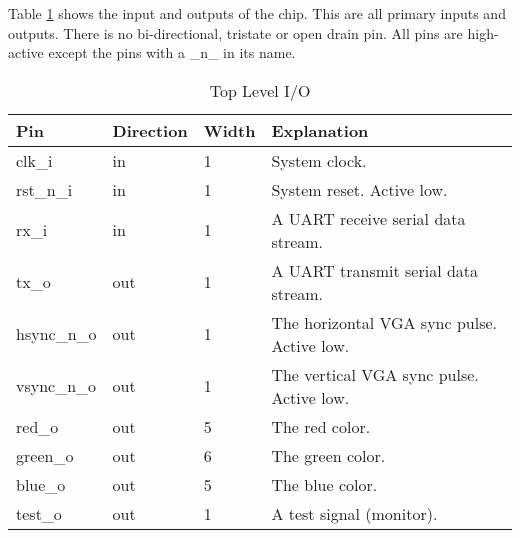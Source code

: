 Table \ref{tab:asTopt01} shows the input and outputs of the chip. This are all primary inputs and outputs. There is no bi-directional, tristate or open drain pin. All pins are high-active except the pins with a \_n\_ in its name.
\begin{table}[H]
\caption{Top Level I/O}
\label{tab:asTopt01}
\centering
\begin{tabularx}{\textwidth}{|l |l |l |X|}
  \hline
  Pin & Direction & Width & Explanation \\
  \hline
  \hline
  clk\_i & in & 1 & System clock. \\
  \hline
  rst\_n\_i & in & 1 & System reset. Active low. \\
  \hline
  rx\_i & in & 1 & A UART receive serial data stream. \\
  \hline
  tx\_o & out & 1 & A UART transmit serial data stream.  \\
  \hline
  hsync\_n\_o & out & 1 & The horizontal VGA sync pulse. Active low. \\
  \hline
  vsync\_n\_o & out & 1 & The vertical VGA sync pulse. Active low. \\
  \hline
  red\_o & out & 5 & The red color.  \\
  \hline
  green\_o & out & 6 & The green color.  \\
  \hline
  blue\_o & out & 5 & The blue color.  \\
  \hline
  test\_o & out & 1 & A test signal (monitor).  \\
  \hline
\end{tabularx}
\end{table}
